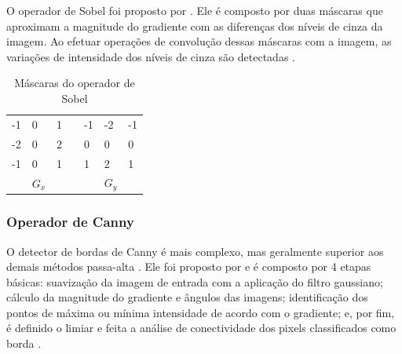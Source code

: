 \documentclass[12pt,oneside,a4paper,english,french,spanish,brazil,]{abntex2}
\begin{document}
O operador de Sobel foi proposto por \citet{sobel:1968}. Ele é composto por duas máscaras que aproximam a magnitude do gradiente com as diferenças dos níveis de cinza da imagem. Ao efetuar operações de convolução dessas máscaras com a imagem, as variações de intensidade dos níveis de cinza são detectadas \cite{pedrini:2008}.

\begin{table}[]
\centering
\caption{Máscaras do operador de Sobel}
\label{tab:Sobel}
\begin{tabular}{lllllll}
\cline{1-3} \cline{5-7}
\multicolumn{1}{|l|}{-1} & \multicolumn{1}{l|}{0} & \multicolumn{1}{l|}{1} & \multicolumn{1}{l|}{} & \multicolumn{1}{l|}{-1} & \multicolumn{1}{l|}{-2} & \multicolumn{1}{l|}{-1} \\ \cline{1-3} \cline{5-7} 
\multicolumn{1}{|l|}{-2} & \multicolumn{1}{l|}{0} & \multicolumn{1}{l|}{2} & \multicolumn{1}{l|}{} & \multicolumn{1}{l|}{0}  & \multicolumn{1}{l|}{0}  & \multicolumn{1}{l|}{0}  \\ \cline{1-3} \cline{5-7} 
\multicolumn{1}{|l|}{-1} & \multicolumn{1}{l|}{0} & \multicolumn{1}{l|}{1} & \multicolumn{1}{l|}{} & \multicolumn{1}{l|}{1}  & \multicolumn{1}{l|}{2}  & \multicolumn{1}{l|}{1}  \\ \cline{1-3} \cline{5-7} 
                         & \(G_x\)                   &                        &                       &                         & \(G_y\)                    &                        
\end{tabular}
\end{table}


\subsubsection{Operador de Canny}

O detector de bordas de Canny é mais complexo, mas geralmente superior aos demais métodos passa-alta \cite{gonzalez:2012}. Ele foi proposto por \citet{canny:1987} e é composto por 4 etapas básicas: suavização da imagem de entrada com a aplicação do filtro gaussiano; cálculo da magnitude do gradiente e ângulos das imagens; identificação dos pontos de máxima ou mínima intensidade de acordo com o gradiente; e, por fim, é definido o limiar e feita a análise de conectividade dos pixels classificados como borda \cite{gonzalez:2012}.


\end{document}
